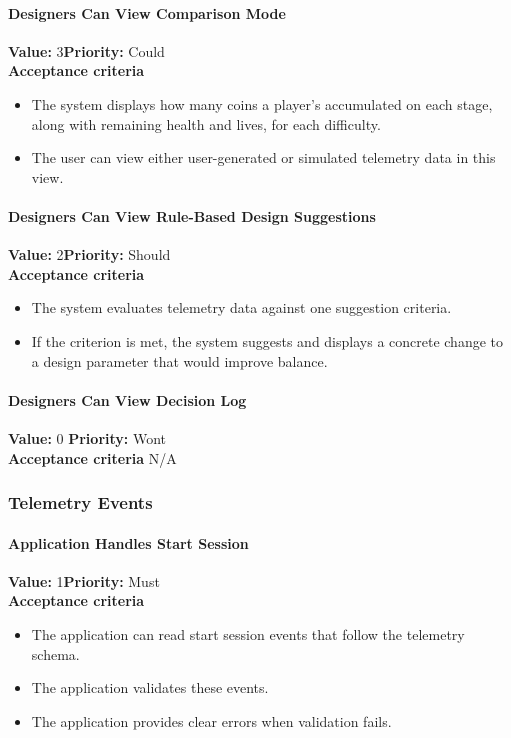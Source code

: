 \paragraph{Designers Can View Comparison Mode}
\textbf{Value:} 3\quad \textbf{Priority:} Could\\
\textbf{Acceptance criteria}
\begin{itemize}
  \item The system displays how many coins a player's accumulated on each stage, along with remaining health and lives, for each difficulty.
  \item The user can view either user-generated or simulated telemetry data in this view.
\end{itemize}

\paragraph{Designers Can View Rule-Based Design Suggestions}
\textbf{Value:} 2\quad \textbf{Priority:} Should\\
\textbf{Acceptance criteria}
\begin{itemize}
  \item The system evaluates telemetry data against one suggestion criteria.
  \item If the criterion is met, the system suggests and displays a concrete change to a design parameter that would improve balance.
\end{itemize}

\paragraph{Designers Can View Decision Log}
\textbf{Value:} 0 \quad \textbf{Priority:} Wont\\
\textbf{Acceptance criteria} N/A

\subsubsection{Telemetry Events}

\paragraph{Application Handles Start Session}
\textbf{Value:} 1\quad \textbf{Priority:} Must\\
\textbf{Acceptance criteria}
\begin{itemize}
  \item The application can read start session events that follow the telemetry schema.
  \item The application validates these events.
  \item The application provides clear errors when validation fails.
\end{itemize}

